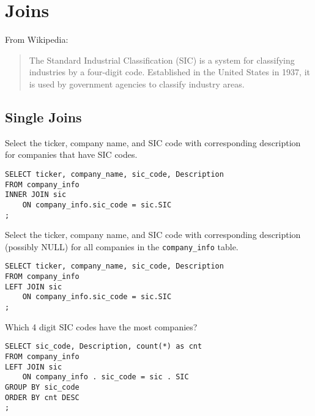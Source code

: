 \documentclass[10pt]{exam}
\begin{document}
\section{Joins}

From Wikipedia:

    \begin{quote}
        The Standard Industrial Classification (SIC) is a system for
        classifying industries by a four-digit code. Established in the
        United States in 1937, it is used by government agencies to
        classify industry areas.
    \end{quote}

\begin{questions}

\subsection*{Single Joins}

\question Select the ticker, company name, and SIC code with corresponding description for
    companies that have SIC codes.

\begin{solution}
\begin{lstlisting}
SELECT ticker, company_name, sic_code, Description
FROM company_info
INNER JOIN sic
    ON company_info.sic_code = sic.SIC
;
\end{lstlisting}
\end{solution}


\question Select the ticker, company name, and SIC code with corresponding
    description (possibly NULL) for
    all companies in the \texttt{company\_info} table. 

\begin{solution}
\begin{lstlisting}
SELECT ticker, company_name, sic_code, Description
FROM company_info
LEFT JOIN sic
    ON company_info.sic_code = sic.SIC
;
\end{lstlisting}
\end{solution}

\question Which 4 digit SIC codes have the most companies?

\begin{solution}
\begin{lstlisting}
SELECT sic_code, Description, count(*) as cnt
FROM company_info
LEFT JOIN sic
    ON company_info . sic_code = sic . SIC
GROUP BY sic_code
ORDER BY cnt DESC
;
\end{lstlisting}
\end{solution}


\end{questions}
\end{document}
